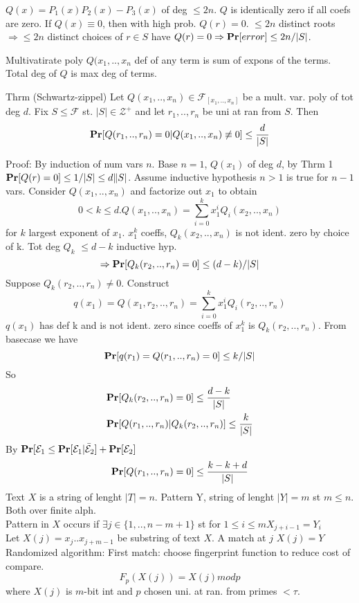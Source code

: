 \documentclass[a4paper]{article}
\def\Pr{\mbox{\textbf{Pr}}}
\begin{document}
\(Q(x) = P_1(x)P_2(x) - P_3(x)\) of deg \(\leq 2n\). \(Q\) is identically zero if all coefs are zero. If \(Q(x) \equiv 0\), then with high prob. \(Q(r)=0\). \(\leq 2n\) distinct roots \(\Rightarrow \leq 2n\) distinct choices of \(r \in S\) have \(Q(r) = 0 \Rightarrow \Pr[error] \leq 2n/|S|\).

Multivatirate poly \(Q(x_1,..,x_n\) def of any term is sum of expons of the terms. Total deg of \(Q\) is max deg of terms.

Thrm (Schwartz-zippel) Let \(Q(x_1,..,x_n) \in \mathcal{F}_{[x_1,..,x_n]}\) be a mult. var. poly of tot deg \(d\). Fix \(S \leq \mathcal{F}\) st. \(|S| \in \mathcal{Z}^+\) and let \(r_1,..,r_n\) be uni at ran from \(S\). Then 
\[\Pr[Q(r_1,..,r_n)=0|Q(x_1,..,x_n) \not\equiv 0] \leq \frac{d}{|S|}\]

Proof: By induction of num vars \(n\). 
Base \(n=1\), \(Q(x_1)\) of deg \(d\), by Thrm 1 \(\Pr[Q(r)=0]\leq 1/|S| \leq d\|S|\).
Assume inductive hypothesis \(n>1\) is true for \(n-1\) vars. Consider \(Q(x_1,..,x_n)\) and factorize out \(x_1\) to obtain 
\[0<k\leq d. Q(x_1,..,x_n) = \sum_{i=0}^k x_1^i Q_i(x_2,..,x_n)\] 
for \(k\) largest exponent of \(x_1\). \(x_1^k\) coeffs, \(Q_k(x_2,..,x_n)\) is not ident. zero by choice of k. Tot deg \(Q_k\) \(\leq d-k\) inductive hyp. \[\Rightarrow \Pr[Q_k(r_2,..,r_n) = 0] \leq (d-k)/|S|\]
Suppose \(Q_k(r_2,..,r_n) \neq 0\). Construct
\[q(x_1) = Q(x_1,r_2,..,r_n) = \sum_{i=0}^k x_1^i Q_i(r_2,..,r_n)\]
\(q(x_1)\) has def k and is not ident. zero since coeffs of \(x_1^k\) is \(Q_k(r_2,..,r_n)\). From basecase we have
\[\Pr[q(r_1) = Q(r_1,..,r_n) = 0] \leq k/|S|\]
So
\begin{align*}
&\Pr[Q_k(r_2,..,r_n)=0] \leq \frac{d-k}{|S|}\\
&\Pr[Q(r_1,..,r_n) | Q_k(r_2,..,r_n)] \leq \frac{k}{|S|}
\end{align*}
By \(\Pr[\mathcal{E}_1 \leq \Pr[\mathcal{E}_1 | \bar{\mathcal{E}}_2] + \Pr[\mathcal{E}_2]\)
\[\Pr[Q(r_1,..,r_n) = 0] \leq \frac{k-k+d}{|S|}\]
Text \(X\) is a string of lenght \(|T|=n\). Pattern Y, string of lenght \(|Y|=m\) st \(m\leq n\). Both over finite alph.\\
Pattern in \(X\) occurs if \(\exists j\in\{1,..,n-m+1\}\) st for \(1\leq i \leq m X_{j+i-1} = Y_i\)\\ 
Let \(X(j)=x_j..x_{j+m-1}\) be substring of text \(X\). A match at \(j\) \(X(j)=Y\)\\
Randomized algorithm: First match: choose fingerprint function to reduce cost of compare. 
\[F_p(X(j)) = X(j) mod p\]
where \(X(j)\) is \(m\)-bit int and \(p\) chosen uni. at ran. from primes \(< \tau\).\\
\end{document}
